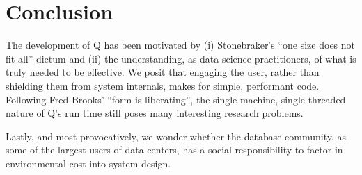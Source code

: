 \section{Conclusion}
\label{end}

The development of Q has been motivated by (i) 
Stonebraker's ``one size does not fit all'' dictum and (ii) the
understanding, as data science practitioners, of what is truly needed to be
effective. We posit that engaging the user, rather than shielding them from
system internals, makes for simple, performant code. 
Following Fred Brooks' ``form is liberating'', the single machine,
single-threaded nature of Q's run time still poses many interesting research
problems. 


Lastly, and most provocatively, we wonder whether the database community, as
some of the largest users of data centers, has a social responsibility 
to factor in environmental cost into system design.
